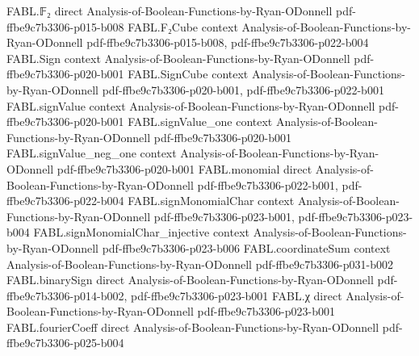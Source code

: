 \begin{theorem}
\label{FABL.majorityThreeCyclicTree_computes}
\leanok
{}
\proofstep
  {FABL.𝔽₂}
  {direct}
  {Analysis-of-Boolean-Functions-by-Ryan-ODonnell}
  {pdf-ffbe9c7b3306-p015-b008}
\proofstep
  {FABL.F₂Cube}
  {context}
  {Analysis-of-Boolean-Functions-by-Ryan-ODonnell}
  {pdf-ffbe9c7b3306-p015-b008,
    pdf-ffbe9c7b3306-p022-b004}
\proofstep
  {FABL.Sign}
  {context}
  {Analysis-of-Boolean-Functions-by-Ryan-ODonnell}
  {pdf-ffbe9c7b3306-p020-b001}
\proofstep
  {FABL.SignCube}
  {context}
  {Analysis-of-Boolean-Functions-by-Ryan-ODonnell}
  {pdf-ffbe9c7b3306-p020-b001,
    pdf-ffbe9c7b3306-p022-b001}
\proofstep
  {FABL.signValue}
  {context}
  {Analysis-of-Boolean-Functions-by-Ryan-ODonnell}
  {pdf-ffbe9c7b3306-p020-b001}
\proofstep
  {FABL.signValue_one}
  {context}
  {Analysis-of-Boolean-Functions-by-Ryan-ODonnell}
  {pdf-ffbe9c7b3306-p020-b001}
\proofstep
  {FABL.signValue_neg_one}
  {context}
  {Analysis-of-Boolean-Functions-by-Ryan-ODonnell}
  {pdf-ffbe9c7b3306-p020-b001}
\proofstep
  {FABL.monomial}
  {direct}
  {Analysis-of-Boolean-Functions-by-Ryan-ODonnell}
  {pdf-ffbe9c7b3306-p022-b001,
    pdf-ffbe9c7b3306-p022-b004}
\proofstep
  {FABL.signMonomialChar}
  {context}
  {Analysis-of-Boolean-Functions-by-Ryan-ODonnell}
  {pdf-ffbe9c7b3306-p023-b001,
    pdf-ffbe9c7b3306-p023-b004}
\proofstep
  {FABL.signMonomialChar_injective}
  {context}
  {Analysis-of-Boolean-Functions-by-Ryan-ODonnell}
  {pdf-ffbe9c7b3306-p023-b006}
\proofstep
  {FABL.coordinateSum}
  {context}
  {Analysis-of-Boolean-Functions-by-Ryan-ODonnell}
  {pdf-ffbe9c7b3306-p031-b002}
\proofstep
  {FABL.binarySign}
  {direct}
  {Analysis-of-Boolean-Functions-by-Ryan-ODonnell}
  {pdf-ffbe9c7b3306-p014-b002,
    pdf-ffbe9c7b3306-p023-b001}
\proofstep
  {FABL.χ}
  {direct}
  {Analysis-of-Boolean-Functions-by-Ryan-ODonnell}
  {pdf-ffbe9c7b3306-p023-b001}
\proofstep
  {FABL.fourierCoeff}
  {direct}
  {Analysis-of-Boolean-Functions-by-Ryan-ODonnell}
  {pdf-ffbe9c7b3306-p025-b004}

\end{theorem}
